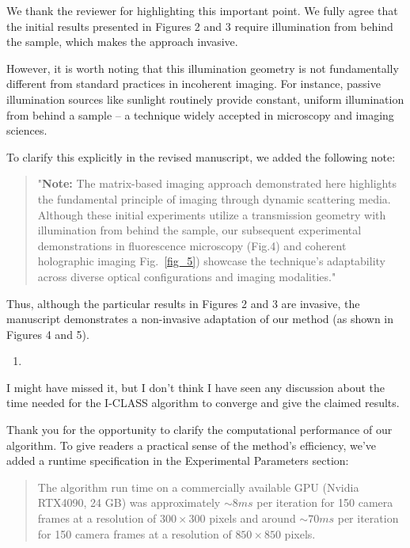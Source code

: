 \documentclass[12pt]{article}
\newenvironment{solved_reviewercomment}
    {\begin{tcolorbox}[width=\linewidth,colback=gray!5,colframe=solved_commentcolor!50,title=Reviewer Comment,left=5pt,right=5pt]}
    {\end{tcolorbox}}
\newenvironment{ourresponse}
    {\begin{tcolorbox}[width=\linewidth,breakable,enhanced,colback=gray!5,colframe=responsecolor!50,title=Response,left=5pt,right=5pt]}
    {\end{tcolorbox}}
\begin{document}
\begin{ourresponse}
    We thank the reviewer for highlighting this important point.
    We fully agree that the initial results presented in Figures 2 and 3 require illumination from behind the sample, which makes the approach invasive. 
    
    However, it is worth noting that this illumination geometry is not fundamentally different from standard practices in incoherent imaging. For instance, passive illumination sources like sunlight routinely provide constant, uniform illumination from behind a sample – a technique widely accepted in microscopy and imaging sciences.
    
    To clarify this explicitly in the revised manuscript, we added the following note:
    \begin{quote}
        "\textbf{Note:} The matrix-based imaging approach demonstrated here highlights the fundamental principle of imaging through dynamic scattering media. Although these initial experiments utilize a transmission geometry with illumination from behind the sample, our subsequent experimental demonstrations in fluorescence microscopy (Fig.4) and coherent holographic imaging Fig.~\ref{fig_5}) showcase the technique's adaptability across diverse optical configurations and imaging modalities."
    \end{quote}
    
    Thus, although the particular results in Figures 2 and 3 are invasive, the manuscript demonstrates a non-invasive adaptation of our method (as shown in Figures 4 and 5).
\end{ourresponse}



\begin{enumerate}[label=\arabic*., resume]
\item \leavevmode
\end{enumerate}
\vspace{-1em}
\begin{solved_reviewercomment}
I might have missed it, but I don't think I have seen any discussion about the time needed for the I-CLASS algorithm to converge and give the claimed results.
\end{solved_reviewercomment}
\begin{ourresponse}
Thank you for the opportunity to clarify the computational performance of our algorithm. To give readers a practical sense of the method's efficiency, we've added a runtime specification in the Experimental Parameters section:

\begin{quote}
    The algorithm run time on a commercially available GPU (Nvidia RTX4090, 24 GB) was approximately $\sim 8ms$ per iteration for 150 camera frames at a resolution of $300 \times 300$ pixels and around $\sim 70ms$ per iteration for 150 camera frames at a resolution of $850 \times 850$ pixels.
\end{quote}
\end{ourresponse}
\end{document}
